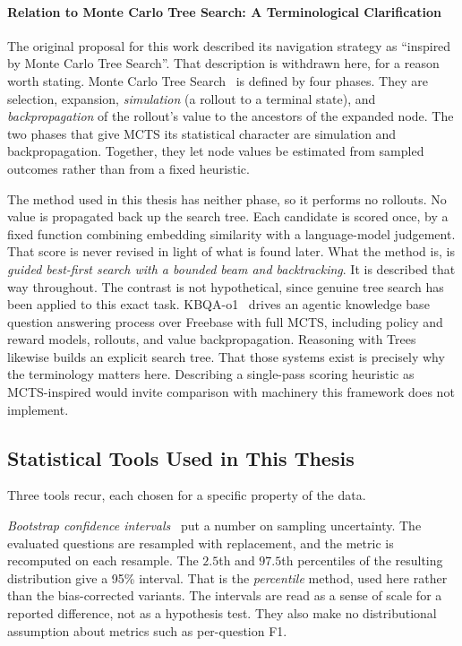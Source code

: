 \paragraph{Relation to Monte Carlo Tree Search: A Terminological
Clarification}\label{sec:mcts-clarification}

The original proposal for this work described its navigation strategy
as ``inspired by Monte Carlo Tree Search''. That
description is withdrawn here, for a reason worth stating. Monte Carlo Tree
Search~\cite{kocsis2006bandit,browne2012survey} is defined by four phases. They
are selection, expansion, \emph{simulation} (a rollout to a terminal state), and
\emph{backpropagation} of the rollout's value to the ancestors of the expanded
node. The two phases that give MCTS its statistical character are simulation and
backpropagation. Together, they let node values be estimated from sampled
outcomes rather than from a fixed heuristic.

The method used in this thesis has neither phase, so it performs no rollouts. No
value is propagated back up the search tree. Each candidate is scored once, by a
fixed function combining embedding similarity with a language-model judgement.
That score is never revised in light of what is found later. What the method is,
is \emph{guided best-first search with a bounded beam and backtracking}. It is
described that way throughout. The contrast is not hypothetical, since genuine
tree search has been applied to this exact task. KBQA-o1~\cite{luo2025kbqao1}
drives an agentic knowledge base question answering process over Freebase with
full MCTS, including policy and reward models, rollouts, and value
backpropagation. Reasoning with Trees~\cite{shen2025reasoning} likewise builds
an explicit search tree. That those systems exist is precisely why the
terminology matters here. Describing a single-pass scoring heuristic as
MCTS-inspired would invite comparison with machinery this framework does not
implement.

\subsection{Statistical Tools Used in This Thesis}\label{sec:stats}

Three tools recur, each chosen for a specific property of the
data.

\emph{Bootstrap confidence intervals}~\cite{efron1979bootstrap} put a number on
sampling uncertainty. The evaluated questions are resampled with replacement,
and the metric is recomputed on each resample. The $2.5$th and $97.5$th
percentiles of the resulting distribution give a 95\% interval. That is the
\emph{percentile} method, used here rather than the bias-corrected variants. The
intervals are read as a sense of scale for a reported difference, not as a
hypothesis test. They also make no distributional assumption about metrics such
as per-question F1.

